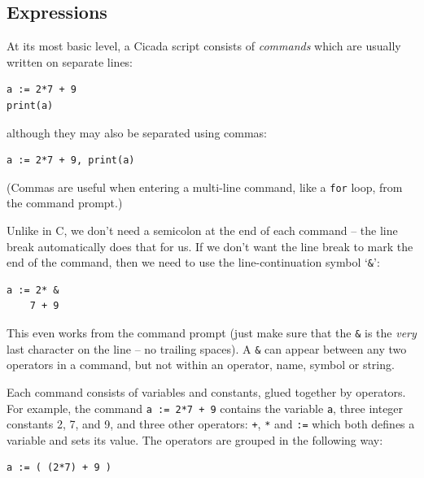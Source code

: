 \documentclass{article}
\newenvironment{code}{
       \begin{list}{}{
               \setlength{\leftmargin}{.4in}
               \setlength{\rightmargin}{0in}
               \setlength{\topsep}{.2in}
       }
       \small
       \item[] }
       { \end{list}   }
\begin{document}

\subsection{Expressions}

At its most basic level, a Cicada script consists of \emph{commands} which are usually written on separate lines:

\begin{code} \begin{verbatim}
a := 2*7 + 9
print(a)
\end{verbatim} \end{code}

\noindent although they may also be separated using commas:

\begin{code} \begin{verbatim}
a := 2*7 + 9, print(a)
\end{verbatim} \end{code}

\noindent (Commas are useful when entering a multi-line command, like a \verb#for# loop, from the command prompt.)

Unlike in C, we don't need a semicolon at the end of each command -- the line break automatically does that for us.  If we don't want the line break to mark the end of the command, then we need to use the line-continuation symbol `\texttt{\&}':

\begin{code} \begin{verbatim}
a := 2* &
    7 + 9
\end{verbatim} \end{code}

\noindent This even works from the command prompt (just make sure that the \texttt{\&} is the \emph{very} last character on the line -- no trailing spaces).  A \verb#&# can appear between any two operators in a command, but not within an operator, name, symbol or string.

Each command consists of variables and constants, glued together by operators.  For example, the command \verb#a := 2*7 + 9# contains the variable \verb#a#, three integer constants 2, 7, and 9, and three other operators:  \verb#+#, \verb#*# and \verb#:=# which both defines a variable and sets its value. The operators are grouped in the following way:

\begin{code} \begin{verbatim}
a := ( (2*7) + 9 )
\end{verbatim} \end{code}
\end{document}
